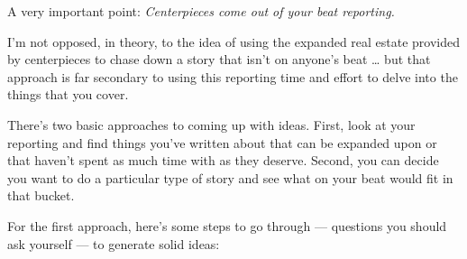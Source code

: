 \documentclass[
  12pt,
  american,
  letterpaperpaper,
  extrafontsizes,onecolumn,openright
  ]{memoir}
\begin{document}
A very important point: \emph{Centerpieces come out of your beat reporting.}

I'm not opposed, in theory, to the idea of using the expanded real estate provided by centerpieces to chase down a story that isn't on anyone's beat \ldots{} but that approach is far secondary to using this reporting time and effort to delve into the things that you cover.

There's two basic approaches to coming up with ideas. First, look at your reporting and find things you've written about that can be expanded upon or that haven't spent as much time with as they deserve. Second, you can decide you want to do a particular type of story and see what on your beat would fit in that bucket.

For the first approach, here's some steps to go through --- questions you should ask yourself --- to generate solid ideas:
\end{document}
